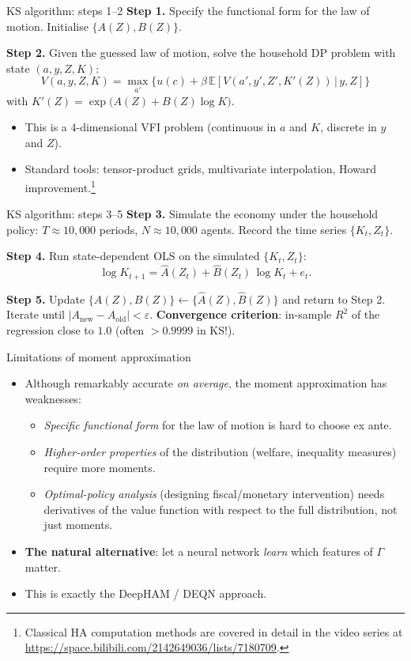 \documentclass[10pt,english,aspectratio=169]{beamer}
\begin{document}
\begin{frame}{KS algorithm: steps 1--2}
\textbf{Step 1.} Specify the functional form for the law of motion. Initialise $\{A(Z), B(Z)\}$.
\medskip

\textbf{Step 2.} Given the guessed law of motion, solve the household DP problem with state $(a,y,Z,K)$:
\[
V(a,y,Z,K) = \max_{a'}\!\big\{u(c) + \beta\,\mathbb{E}\!\left[V(a',y',Z',K'(Z))\,|\,y,Z\right]\big\}
\]
with $K'(Z) = \exp\!\big(A(Z) + B(Z)\log K\big)$.
\medskip
\begin{itemize}
\item This is a 4-dimensional VFI problem (continuous in $a$ and $K$, discrete in $y$ and $Z$).
\item Standard tools: tensor-product grids, multivariate interpolation, Howard improvement.\footnote{\scriptsize Classical HA computation methods are covered in detail in the video series at \url{https://space.bilibili.com/2142649036/lists/7180709}.}
\end{itemize}
\end{frame}

\begin{frame}{KS algorithm: steps 3--5}
\textbf{Step 3.} Simulate the economy under the household policy: $T \approx 10{,}000$ periods, $N \approx 10{,}000$ agents. Record the time series $\{K_t, Z_t\}$.
\medskip

\textbf{Step 4.} Run state-dependent OLS on the simulated $\{K_t, Z_t\}$:
\[
\log K_{t+1} = \hat A(Z_t) + \hat B(Z_t)\,\log K_t + e_t.
\]
\medskip

\textbf{Step 5.} Update $\{A(Z), B(Z)\} \leftarrow \{\hat A(Z), \hat B(Z)\}$ and return to Step 2. Iterate until $|A_{\text{new}} - A_{\text{old}}| < \varepsilon$.
\medskip
\textbf{Convergence criterion}: in-sample $R^2$ of the regression close to $1.0$ (often $> 0.9999$ in KS!).
\end{frame}

\begin{frame}{Limitations of moment approximation}
\begin{itemize}
\item Although remarkably accurate \emph{on average}, the moment approximation has weaknesses:
\medskip
\begin{itemize}
\item \emph{Specific functional form} for the law of motion is hard to choose ex ante.
\item \emph{Higher-order properties} of the distribution (welfare, inequality measures) require more moments.
\item \emph{Optimal-policy analysis} (designing fiscal/monetary intervention) needs derivatives of the value function with respect to the full distribution, not just moments.
\end{itemize}
\medskip
\item \textbf{The natural alternative}: let a neural network \emph{learn} which features of $\Gamma$ matter.
\medskip
\item This is exactly the DeepHAM / DEQN approach.
\end{itemize}
\end{frame}
\end{document}
